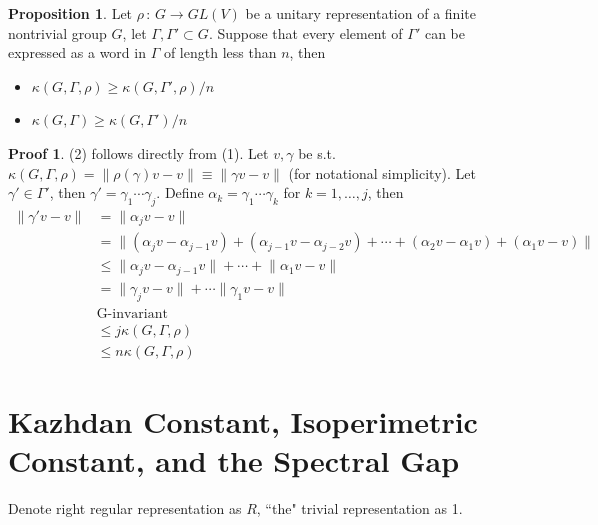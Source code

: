 \documentclass{book}
\newcommand{\norm}[1]{\lVert #1 \rVert}
\theoremstyle{definition}
\newtheorem{proposition}[lemma]{Proposition}
\theoremstyle{remarkstyle}
\newtheorem*{myproof}{Proof}%
\begin{document}
\begin{proposition}
    Let $\rho\,:\,G\rightarrow GL(V)$ be a unitary representation of a finite nontrivial group $G$, let $\Gamma,\Gamma'\subset G$. Suppose that every element of $\Gamma'$ can be expressed as a word in $\Gamma$ of length less than $n$, then 
    \begin{itemize}
        \item $\kappa(G,\Gamma,\rho)\ge \kappa(G,\Gamma',\rho)/n$
        \item $\kappa(G,\Gamma)\ge \kappa(G,\Gamma')/n$ 
    \end{itemize}
\end{proposition}
\begin{myproof}
    (2) follows directly from (1). Let $v,\gamma$ be s.t. $\kappa(G,\Gamma,\rho)=\norm{\rho(\gamma)v-v} \equiv \norm{\gamma v-v}$ (for notational simplicity). Let $\gamma'\in\Gamma'$, then $\gamma'=\gamma_1\cdots\gamma_j$. Define $\alpha_k=\gamma_1\cdots\gamma_k$ for $k=1,\dots,j$, then 
    \begin{align*}
        \norm{\gamma' v-v} &= \norm{\alpha_jv-v} \\
        &= \norm{(\alpha_jv-\alpha_{j-1}v) + (\alpha_{j-1}v-\alpha_{j-2}v) + \cdots + (\alpha_2v-\alpha_{1}v) + (\alpha_1v-v)  }  \\
        &\le \norm{\alpha_{j}v-\alpha_{j-1}v} + \cdots + \norm{\alpha_{1}v-v} \\
        &= \norm{\gamma_jv-v} + \cdots \norm{\gamma _1v-v} \\
        &\textrm{G-invariant} \\
        &\le j\kappa(G,\Gamma,\rho) \\
        &\le n\kappa(G,\Gamma,\rho) 
    \end{align*}
    \newline 
\end{myproof}





\section{Kazhdan Constant, Isoperimetric Constant, and the Spectral Gap}
Denote right regular representation as $R$, ``the" trivial representation as 1. \newline 
\end{document}
